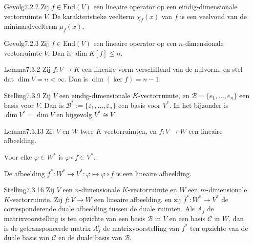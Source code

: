 \begin{res}{Gevolg}{7.2.2}
Zij $f\in\mathrm{End}(V)$ een lineaire operator op een eindig-dimensionale vectorruimte $V$. De karakteristieke veelterm $\chi_f(x)$ van $f$ is een veelvoud van de minimaalveelterm $\mu_f(x)$.
\end{res}

\begin{res}{Gevolg}{7.2.3}
Zij $f\in\mathrm{End}(V)$ een lineaire operator op een $n$-dimensionale vectorruimte $V$. Dan is $\dim K[f]\le n$.
\end{res}

\begin{res}{Lemma}{7.3.2}
Zij $f:V\to K$ een lineaire vorm verschillend van de nulvorm, en stel dat $\dim V=n<\infty$. Dan is $\dim(\ker f)=n-1$.
\end{res}

\begin{res}{Stelling}{7.3.9}
Zij $V$ een eindig-dimensionale $K$-vectorruimte, en $\mathcal B=\{e_1,\dots,e_n\}$ een basis voor $V$. Dan is $\mathcal B^*:=\{\varepsilon_1,\dots,\varepsilon_n\}$ een basis voor $V^*$. In het bijzonder is $\dim V^*=\dim V$ en bijgevolg $V^*\cong V$.
\end{res}

\begin{res}{Lemma}{7.3.13}
Zij $V$ en $W$ twee $K$-vectorruimten, en $f:V\to W$ een lineaire afbeelding.
\begin{myenum}
\item Voor elke $\varphi\in W^*$ is $\varphi\circ f\in V^*$.
\item De afbeelding $f^*:W^*\to V^*:\varphi\mapsto\varphi\circ f$ is een lineaire afbeelding.
\end{myenum}
\end{res}

\begin{res}{Stelling}{7.3.16}
Zij $V$ een $n$-dimensionale $K$-vectorruimte en $W$ een $m$-dimensionale $K$-vectorruimte. Zij $f:V\to W$ een lineaire afbeelding, en zij $f^*:W^*\to V^*$ de corresponderende duale afbeelding tussen de duale ruimten. Als $A_f$ de matrixvoorstelling is ten opzichte van een basis $\mathcal B$ in $V$ en een basis $\mathcal C$ in $W$, dan is de getransponeerde matrix $A_f^t$ de matrixvoorstelling van $f^*$ ten opzichte van de duale basis van $\mathcal C$ en de duale basis van $\mathcal B$.
\end{res}